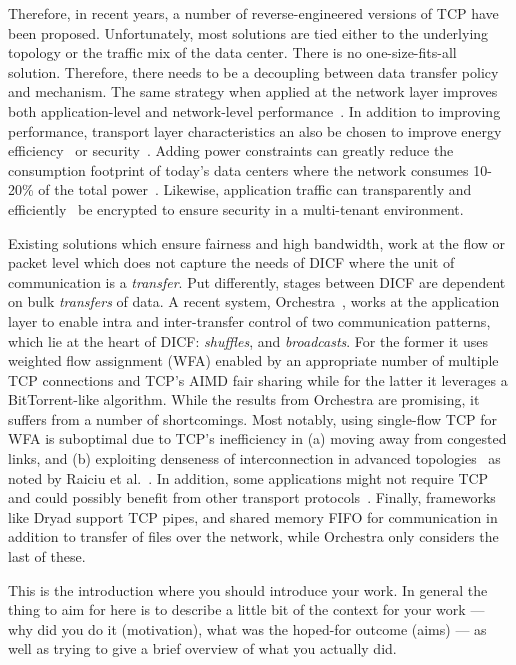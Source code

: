 \documentclass[a4paper,12pt,twoside,openright]{report}
\begin{document}
Therefore, in recent years, a number of reverse-engineered versions of TCP have
been proposed. Unfortunately, most solutions are tied either to the underlying
topology or the traffic mix of the data center. There is no one-size-fits-all
solution. Therefore, there needs to be a decoupling between data transfer policy
and mechanism. The same strategy when applied at the network layer improves both
application-level and network-level performance~\cite{Abu-Libdeh:2010:SRF}. In
addition to improving performance, transport layer characteristics an also be
chosen to improve energy efficiency~\cite{Heller:2010:ESE} or
security~\cite{bittau:the}. Adding power constraints can greatly reduce the
consumption footprint of today's data centers where the network consumes 10-20\%
of the total power~\cite{Greenberg:2008:CCR}.
Likewise, application traffic can transparently and
efficiently~\cite{bittau:the} be encrypted to ensure security in a multi-tenant
environment.


Existing solutions which ensure fairness and high bandwidth, work at the flow or
packet level which does not capture the needs of DICF where the unit of
communication is a \emph{transfer}.
Put differently, stages between DICF are dependent on bulk \emph{transfers} of
data. A recent system, Orchestra~\cite{Chowdhury:2011:MDT}, works at the
application layer to enable intra and inter-transfer control of two
communication patterns, which lie at the heart of DICF: \emph{shuffles}, and
\emph{broadcasts}. For the former it uses weighted flow assignment (WFA) enabled
by an appropriate number of multiple TCP connections and TCP's AIMD fair sharing
while for the latter it leverages a BitTorrent-like algorithm. While the results
from Orchestra are promising, it suffers from a number of shortcomings. Most
notably, using single-flow TCP for WFA is suboptimal due to TCP's inefficiency
in (a) moving away from congested links, and (b) exploiting denseness of
interconnection in advanced
topologies~\cite{Al-Fares:2008:SCD,Guo:2008:DSF,Guo:2009:BHP,Greenberg:2009:VSF}
as noted by Raiciu et al.~\cite{Raiciu:2011:IDP}. In addition, some applications
might not require TCP and could possibly benefit from other transport
protocols~\cite{bittau:the,Alizadeh:2010:DCT,Vasudevan:2009:SEF,Raiciu:2010:DCN,Wilson:2011:BNL}.
Finally, frameworks like Dryad support TCP pipes, and shared memory FIFO for
communication in addition to transfer of files over the network, while Orchestra
only considers the last of these.

This is the introduction where you should introduce your work.  In
general the thing to aim for here is to describe a little bit of the
context for your work --- why did you do it (motivation), what was the
hoped-for outcome (aims) --- as well as trying to give a brief
overview of what you actually did.
\end{document}

